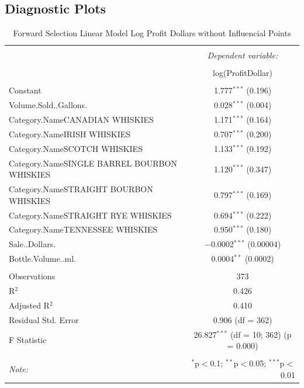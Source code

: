 \documentclass[]{elsarticle} %
\begin{document}
\subsection{Diagnostic Plots}\label{diagnostic-plots}

\begin{table}[!htbp] \centering 
  \caption{Forward Selection Linear Model Log Profit Dollars without Influencial Points} 
  \label{} 
\normalsize 
\begin{tabular}{@{\extracolsep{5pt}}lc} 
\\[-1.8ex]\hline 
\hline \\[-1.8ex] 
 & \multicolumn{1}{c}{\textit{Dependent variable:}} \\ 
\cline{2-2} 
\\[-1.8ex] & log(ProfitDollar) \\ 
\hline \\[-1.8ex] 
 Constant & 1.777$^{***}$ (0.196) \\ 
  Volume.Sold..Gallons. & 0.028$^{***}$ (0.004) \\ 
  Category.NameCANADIAN WHISKIES & 1.171$^{***}$ (0.164) \\ 
  Category.NameIRISH WHISKIES & 0.707$^{***}$ (0.200) \\ 
  Category.NameSCOTCH WHISKIES & 1.133$^{***}$ (0.192) \\ 
  Category.NameSINGLE BARREL BOURBON WHISKIES & 1.120$^{***}$ (0.347) \\ 
  Category.NameSTRAIGHT BOURBON WHISKIES & 0.797$^{***}$ (0.169) \\ 
  Category.NameSTRAIGHT RYE WHISKIES & 0.694$^{***}$ (0.222) \\ 
  Category.NameTENNESSEE WHISKIES & 0.950$^{***}$ (0.180) \\ 
  Sale..Dollars. & $-$0.0002$^{***}$ (0.00004) \\ 
  Bottle.Volume..ml. & 0.0004$^{**}$ (0.0002) \\ 
 \hline \\[-1.8ex] 
Observations & 373 \\ 
R$^{2}$ & 0.426 \\ 
Adjusted R$^{2}$ & 0.410 \\ 
Residual Std. Error & 0.906 (df = 362) \\ 
F Statistic & 26.827$^{***}$ (df = 10; 362)  (p = 0.000) \\ 
\hline 
\hline \\[-1.8ex] 
\textit{Note:}  & \multicolumn{1}{r}{$^{*}$p$<$0.1; $^{**}$p$<$0.05; $^{***}$p$<$0.01} \\ 
\end{tabular} 
\end{table}
\end{document}
